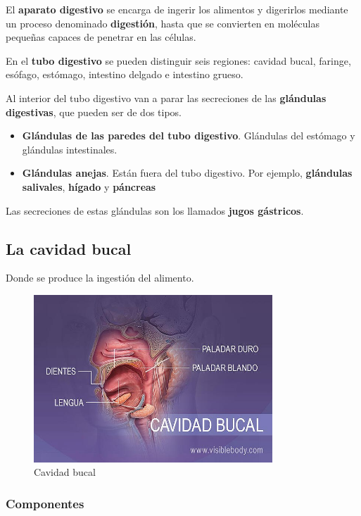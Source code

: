 \documentclass{article}
\begin{document}
		El \textbf{aparato digestivo} se encarga de ingerir los alimentos y digerirlos mediante un proceso denominado \textbf{digestión}, hasta que se convierten en moléculas pequeñas capaces de penetrar en las células.
		\par En el \textbf{tubo digestivo} se pueden distinguir seis regiones: cavidad bucal, faringe, esófago, estómago, intestino delgado e intestino grueso.
		\par Al interior del tubo digestivo van a parar las secreciones de las \textbf{glándulas digestivas}, que pueden ser de dos tipos.
		
		\begin{itemize}
			\item \textbf{Glándulas de las paredes del tubo digestivo}. Glándulas del estómago y glándulas intestinales.
			\item \textbf{Glándulas anejas}. Están fuera del tubo digestivo. Por ejemplo, \textbf{glándulas salivales}, \textbf{hígado} y \textbf{páncreas}
		\end{itemize}
		\par Las secreciones de estas glándulas son los llamados \textbf{jugos gástricos}.
		
		\subsection{La cavidad bucal}
		
			Donde se produce la ingestión del alimento. 
			
			\begin{figure}[htp]
				\centering
				\includegraphics[width=0.8\textwidth]{cavidad_oral}
				\caption{Cavidad bucal}
				\label{fig:cavidad_oral}
			\end{figure}
		
			\subsubsection*{Componentes}
			
\end{document}
